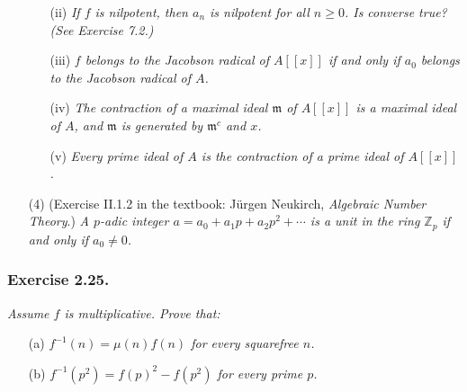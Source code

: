 \documentclass{article}
\begin{document}
\begin{enumerate}
\begin{enumerate}
  \item[(ii)]
    \emph{If $f$ is nilpotent, then $a_n$ is nilpotent for all $n \geq 0$.
    Is converse true? (See Exercise 7.2.)}

  \item[(iii)]
    \emph{$f$ belongs to the Jacobson radical of $A[[x]]$ if and only if
    $a_0$ belongs to the Jacobson radical of $A$.}

  \item[(iv)]
    \emph{The contraction of a maximal ideal $\mathfrak{m}$ of $A[[x]]$ is a maximal ideal of $A$,
    and $\mathfrak{m}$ is generated by $\mathfrak{m}^c$ and $x$.}

  \item[(v)]
    \emph{Every prime ideal of $A$ is the contraction of a prime ideal of $A[[x]]$.} \\
  \end{enumerate}

\item[(4)]
  (Exercise II.1.2 in the textbook: Jürgen Neukirch, \emph{Algebraic Number Theory}.)
  \emph{A $p$-adic integer $a = a_0 + a_1 p + a_2 p^2 + \cdots$
  is a unit in the ring $\mathbb{Z}_p$ if and only if $a_0 \neq 0$.} \\
\end{enumerate}






\subsubsection*{Exercise 2.25.}
\emph{Assume $f$ is multiplicative. Prove that:}
\begin{enumerate}
\item[(a)]
  \emph{$f^{-1}(n) = \mu(n)f(n)$ for every squarefree $n$.}

\item[(b)]
  \emph{$f^{-1}(p^2) = f(p)^2 - f(p^2)$ for every prime $p$.} \\
\end{enumerate}
\end{document}
